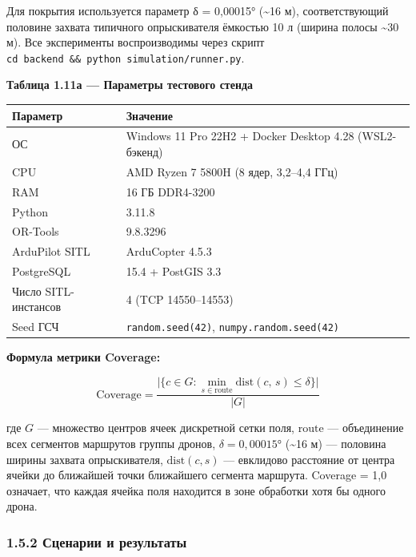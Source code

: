Для покрытия используется параметр δ = 0,00015° (\textasciitilde16 м), соответствующий половине захвата типичного опрыскивателя ёмкостью 10 л (ширина полосы \textasciitilde30 м). Все эксперименты воспроизводимы через скрипт \texttt{cd\ backend\ \&\&\ python\ simulation/runner.py}.

\textbf{Таблица 1.11а --- Параметры тестового стенда}

\begin{longtable}[]{@{}ll@{}}
\toprule\noalign{}
Параметр & Значение \\
\midrule\noalign{}
\endhead
\bottomrule\noalign{}
\endlastfoot
ОС & Windows 11 Pro 22H2 + Docker Desktop 4.28 (WSL2-бэкенд) \\
CPU & AMD Ryzen 7 5800H (8 ядер, 3,2--4,4 ГГц) \\
RAM & 16 ГБ DDR4-3200 \\
Python & 3.11.8 \\
OR-Tools & 9.8.3296 \\
ArduPilot SITL & ArduCopter 4.5.3 \\
PostgreSQL & 15.4 + PostGIS 3.3 \\
Число SITL-инстансов & 4 (TCP 14550--14553) \\
Seed ГСЧ & \texttt{random.seed(42)}, \texttt{numpy.random.seed(42)} \\
\end{longtable}

\textbf{Формула метрики Coverage:}

\[\mathrm{Coverage} = \frac{\bigl|\{c \in G : \min_{s \in \mathrm{route}} \mathrm{dist}(c,\, s) \leq \delta\}\bigr|}{|G|}\]

где \(G\) --- множество центров ячеек дискретной сетки поля, \(\mathrm{route}\) --- объединение всех сегментов маршрутов группы дронов, \(\delta = 0{,}00015°\) (\textasciitilde16 м) --- половина ширины захвата опрыскивателя, \(\mathrm{dist}(c, s)\) --- евклидово расстояние от центра ячейки до ближайшей точки ближайшего сегмента маршрута. Coverage = 1,0 означает, что каждая ячейка поля находится в зоне обработки хотя бы одного дрона.

\hypertarget{ux441ux446ux435ux43dux430ux440ux438ux438-ux438-ux440ux435ux437ux443ux43bux44cux442ux430ux442ux44b}{%
\subsubsection{1.5.2 Сценарии и результаты}\label{ux441ux446ux435ux43dux430ux440ux438ux438-ux438-ux440ux435ux437ux443ux43bux44cux442ux430ux442ux44b}}

